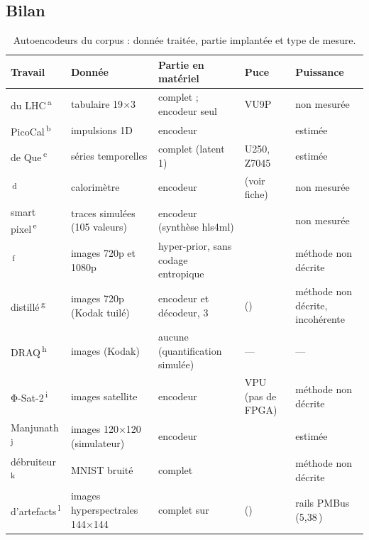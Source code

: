 \subsection{Bilan}

\begin{table}[!htbp]
\centering\footnotesize
\caption{Autoencodeurs du corpus : donnée traitée, partie implantée et type de mesure.}
\label{tab:ae}
\begin{tabularx}{\textwidth}{@{}P{2.6cm}P{3.1cm}LP{2cm}P{2.4cm}@{}}
\toprule
Travail & Donnée & Partie en matériel & Puce & Puissance \\
\midrule
{} du LHC\,\textsuperscript{a} & tabulaire 19$\times$3 &  complet ;  encodeur seul & VU9P & non mesurée \\
PicoCal\,\textsuperscript{b} & impulsions 1D & encodeur &  & estimée \\
 de Que\,\textsuperscript{c} & séries temporelles &  complet (latent 1) & U250, Z7045 & estimée \\
\,\textsuperscript{d} & calorimètre & encodeur & \nr{} (voir fiche) & non mesurée \\
 smart pixel\,\textsuperscript{e} & traces simulées (105 valeurs) & encodeur (synthèse hls4ml) & \nr{} & non mesurée \\
\,\textsuperscript{f} & images 720p et 1080p &  hyper-prior, sans codage entropique &  & méthode non décrite \\
 distillé\,\textsuperscript{g} & images 720p (Kodak tuilé) & encodeur et décodeur, 3  &  () & méthode non décrite, incohérente \\
DRAQ\,\textsuperscript{h} & images (Kodak) & aucune (quantification simulée) & --- & --- \\
Φ-Sat-2\,\textsuperscript{i} & images satellite & encodeur & VPU (pas de FPGA) & méthode non décrite \\
Manjunath\,\textsuperscript{j} & images 120$\times$120 (simulateur) & encodeur &  & estimée \\
 débruiteur\,\textsuperscript{k} & MNIST bruité &  complet &  & méthode non décrite \\
 d'artefacts\,\textsuperscript{l} & images hyperspectrales 144$\times$144 &  complet sur  &  () & rails PMBus (5,38\,) \\

\end{tabularx}
\end{table}
